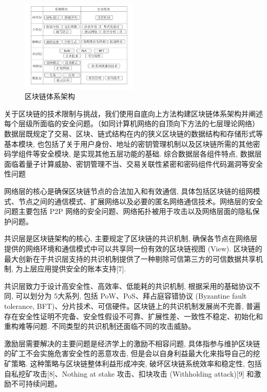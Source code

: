 \begin{figure}
	\centering
	\includegraphics[width=0.5\textwidth]{img/2.png}
	\caption{区块链体系架构}
	\label{fig:example}
\end{figure}

关于区块链的技术限制与挑战，我们使用自底向上方法构建区块链体系架构并阐述每个层级所面临的安全问题。（如同计算机网络的自顶向下方法的七层理论网络） \\


数据层既规定了交易、区块、链式结构在内的狭义区块链的数据结构和存储形式等基本模块, 也包括了关于用户身份、地址的密钥管理机制以及区块链所需的其他密码学组件等安全模块, 是实现其他五层功能的基础. 综合数据层各组件特点, 数据层面临着量子计算威胁、密钥管理不当、交易关联性紧密和密码组件代码漏洞等安全性问题

网络层的核心是确保区块链节点的合法加入和有效通信, 具体包括区块链的组网模式、节点之间的通信模式、扩展网络以及必要的匿名网络通信技术。网络层的安全问题主要包括 P2P 网络的安全问题、网络拓扑被用于攻击以及网络层面的隐私保护问题。

共识层是区块链架构的核心, 主要规定了区块链的共识机制, 确保各节点在网络层提供的网络环境和通信模式中可以共享同一份有效的区块链视图 (View). 区块链的最大创新在于共识层支持的共识机制提供了一种剔除可信第三方的可信数据共享机制, 为上层应用提供安全的账本支持[7]. 

共识层致力于设计高安全性、高效率、低能耗的共识机制, 根据采用的基础协议不同, 可以划分为 5大系列, 包括 PoW、PoS、拜占庭容错协议 (Byzantine fault tolerance, BFT)、分片技术、可信硬件。区块链上的共识机制发展尚不完善, 普遍存在安全性证明不完备、安全性假设不可靠、扩展性差、一致性不稳定、初始化和重构难等问题. 不同类型的共识机制还面临不同的攻击威胁。

激励层需要解决的主要问题是经济学上的激励不相容问题, 具体指参与维护区块链的矿工不会实施危害安全性的恶意攻击, 但是会以自身利益最大化来指导自己的挖矿策略. 这种策略与区块链整体利益形成冲突, 破坏区块链系统效率和稳定性, 包括自私挖矿攻击[8]、Nothing at stake 攻击、扣块攻击 (Withholding attack)[9] 和激励不可持续问题。

